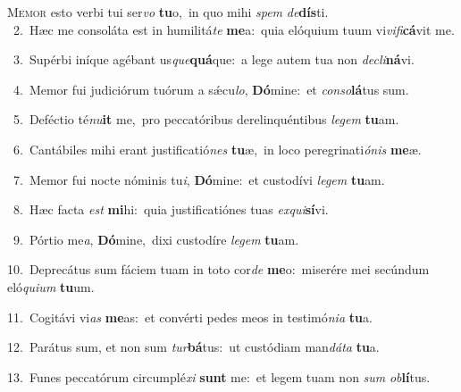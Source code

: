 \lettrine{\initial\textcolor{\initialcolor}{M}}{emor} esto verbi tui ser\textit{vo} \textbf{tu}\-o,~\star in quo mihi \textit{spem} \textit{de}\-\textbf{dís}ti.\\
{\numbfont\textcolor{\numbcolor}{~2.}}~Hæc me consoláta est in humilitá\textit{te} \textbf{me}\-a:~\star quia elóquium tuum vi\-\textit{vi}\-\textit{fi}\textbf{cá}vit me.\par
{\numbfont\textcolor{\numbcolor}{~3.}}~Supérbi iníque agébant us\-\textit{que}\-\textbf{quá}que:~\star a lege autem tua non \textit{de}\-\textit{cli}\textbf{ná}vi.\par
{\numbfont\textcolor{\numbcolor}{~4.}}~Memor fui judiciórum tuórum a sǽcu\-\textit{lo}\-, \textbf{Dó}\-mine:~\star et \textit{con}\-\textit{so}\textbf{lá}tus sum.\par
{\numbfont\textcolor{\numbcolor}{~5.}}~Deféctio té\-\textit{nu}\-\textbf{it} me,~\star pro peccatóribus derelinquéntibus \textit{le}\-\textit{gem} \textbf{tu}\-am.\par
{\numbfont\textcolor{\numbcolor}{~6.}}~Cantábiles mihi erant justificatió\textit{nes} \textbf{tu}\-æ,~\star in loco peregrinati\-\textit{ó}\-\textit{nis} \textbf{me}\-æ.\par
{\numbfont\textcolor{\numbcolor}{~7.}}~Memor fui nocte nóminis tu\-\textit{i}\-, \textbf{Dó}\-mine:~\star et custodívi \textit{le}\-\textit{gem} \textbf{tu}\-am.\par
{\numbfont\textcolor{\numbcolor}{~8.}}~Hæc facta \textit{est} \textbf{mi}\-hi:~\star quia justificatiónes tuas \textit{ex}\-\textit{qui}\textbf{sí}vi.\par
{\numbfont\textcolor{\numbcolor}{~9.}}~Pórtio me\-\textit{a}\-, \textbf{Dó}\-mine,~\star dixi custodíre \textit{le}\-\textit{gem} \textbf{tu}\-am.\par
{\numbfont\textcolor{\numbcolor}{10.}}~Deprecátus sum fáciem tuam in toto cor\textit{de} \textbf{me}\-o:~\star miserére mei secúndum eló\-\textit{qui}\-\textit{um} \textbf{tu}\-um.\par
{\numbfont\textcolor{\numbcolor}{11.}}~Cogitávi vi\textit{as} \textbf{me}\-as:~\star et convérti pedes meos in testimó\-\textit{ni}\-\textit{a} \textbf{tu}\-a.\par
{\numbfont\textcolor{\numbcolor}{12.}}~Parátus sum, et non sum \textit{tur}\-\textbf{bá}tus:~\star ut custódiam man\-\textit{dá}\-\textit{ta} \textbf{tu}\-a.\par
{\numbfont\textcolor{\numbcolor}{13.}}~Funes peccatórum circumplé\textit{xi} \textbf{sunt} me:~\star et legem tuam non \textit{sum} \textit{ob}\-\textbf{lí}tus.\par
